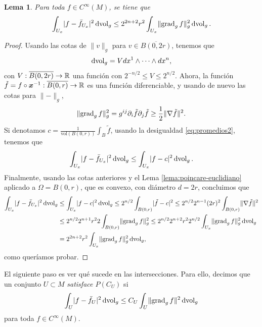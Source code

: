 \documentclass[11pt,a4paper]{amsbook}
\newtheorem{lemma}[subsection]{Lema}
\theoremstyle{remark} \newtheorem{rmk}[subsection]{Observación}
\theoremstyle{definition} \newtheorem{defn}[subsection]{Definición}
\theoremstyle{definition} \newtheorem{ex}[subsection]{Ejemplo}
\theoremstyle{definition} \newtheorem{ej}[subsection]{Ejercicio}
\begin{document}
\begin{lemma} \label{lema:poincare-local}
  Para toda $f\in C^\infty(M)$, se tiene que
  \begin{equation*}
\int_{U_x} \lvert f - \bar{f}_{U_x} \rvert^2 \operatorname{dvol}_g \leq 2^{2n+2} r^2 \int_{U_x} \lVert\operatorname{grad}_g f \rVert_g^2 \operatorname{dvol}_g.
  \end{equation*}
\end{lemma}

\begin{proof}
Usando las cotas de $\lVert v \rVert_g$ para $v\in \overline{B(0,2r)}$, tenemos que
\begin{equation*}
\operatorname{dvol}_g = V dx^1\wedge \cdots \wedge dx^n,
\end{equation*}
con $V:\overline{B(0,2r)}\rightarrow \mathbb R$ una función con $2^{-n/2}\leq V \leq 2^{n/2}$.
Ahora, la función $\tilde{f}=f\circ \bm{x}^{-1}:\overline{B(0,r)}\rightarrow \mathbb R$ es una función diferenciable, y usando de nuevo las cotas para $\lVert - \rVert_g$,
\begin{equation*}
\lVert \operatorname{grad}_g f \rVert_g^2 = g^{ij} \partial_i \tilde{f} \partial_j\tilde{f} \geq \frac{1}{2} \lVert \nabla \tilde{f} \rVert^2.
\end{equation*}
Si denotamos $c=\frac{1}{\mathrm{vol}(B(0,r))} \int_B \tilde{f}$, usando la desigualdad \eqref{eq:promedios2}, tenemos que
\begin{equation*}
\int_{U_x} \lvert f - \bar{f}_{U_x} \rvert^2 \operatorname{dvol}_g \leq \int_{U_x} \lvert f - c \rvert^2 \operatorname{dvol}_g.
\end{equation*}
Finalmente, usando las cotas anteriores y el Lema \ref{lema:poincare-euclidiano} aplicado a $\Omega=B(0,r)$, que es convexo, con diámetro $d=2r$, concluimos que
\begin{align*}
  \int_{U_x} \lvert f - \bar{f}_{U_x} \rvert^2 \operatorname{dvol}_g &\leq \int_{U_x} \lvert f - c \rvert^2 \operatorname{dvol}_g \leq 2^{n/2} \int_{B(0,r)} \lvert \tilde{f} - c \rvert^2 \leq 2^{n/2}2^{n-1}(2r)^2 \int_{B(0,r)} \lVert \nabla \tilde{f} \rVert^2 \\
                                & \leq 2^{n/2}2^{n+1}r^2 2 \int_{B(0,r)} \lVert \operatorname{grad}_g f \rVert_g^2 \leq 2^{n/2} 2^{n+2} r^2 2^{n/2} \int_{U_x} \lVert \operatorname{grad}_g f \rVert_g^2 \operatorname{dvol}_g \\
                                  &= 2^{2n+2} r^2 \int_{U_x}\lVert \operatorname{grad}_g f \rVert_g^2 \operatorname{dvol}_g,
\end{align*}
como queríamos probar.
\end{proof}

El siguiente paso es ver qué sucede en las intersecciones. Para ello, decimos que un conjunto $U\subset M$ \emph{satisface $P(C_U)$} si
\begin{equation*}
\int_U \lvert f- \bar{f}_U \rvert^2 \operatorname{dvol}_g \leq C_U \int_U \lVert \operatorname{grad}_g f \rVert^2 \operatorname{dvol}_g
\end{equation*}
para toda $f\in C^\infty(M)$.
\end{document}
